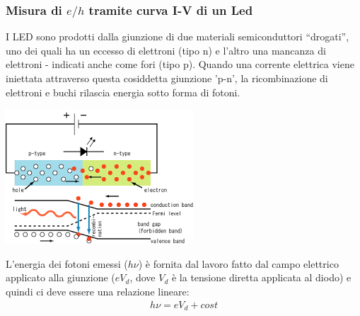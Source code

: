 \frame    
{
  \frametitle{Misura di $e/h$ tramite curva I-V di un Led}
  
  I LED sono prodotti dalla giunzione di due materiali semiconduttori ``drogati'', uno dei quali ha un eccesso di elettroni (tipo n) e l'altro
  una mancanza di elettroni - indicati anche come fori (tipo p). Quando una corrente elettrica viene iniettata attraverso questa cosiddetta
  giunzione 'p-n', la ricombinazione di elettroni e buchi rilascia energia sotto forma di fotoni.

  \begin{minipage}{0.5\linewidth}{
  \begin{center}
    \includegraphics[width=0.9\linewidth]{figs/led.png}
  \end{center}
  }\end{minipage}\begin{minipage}{0.5\linewidth}{
  L'energia dei fotoni emessi ($h\nu$) \`e fornita dal lavoro fatto dal campo elettrico applicato alla giunzione
  ($eV_d$, dove $V_d$ \`e la tensione diretta applicata al diodo) e quindi ci deve essere una relazione lineare:
  \begin{align*}
     h\nu = eV_d + cost
  \end{align*}
  }\end{minipage}
}

